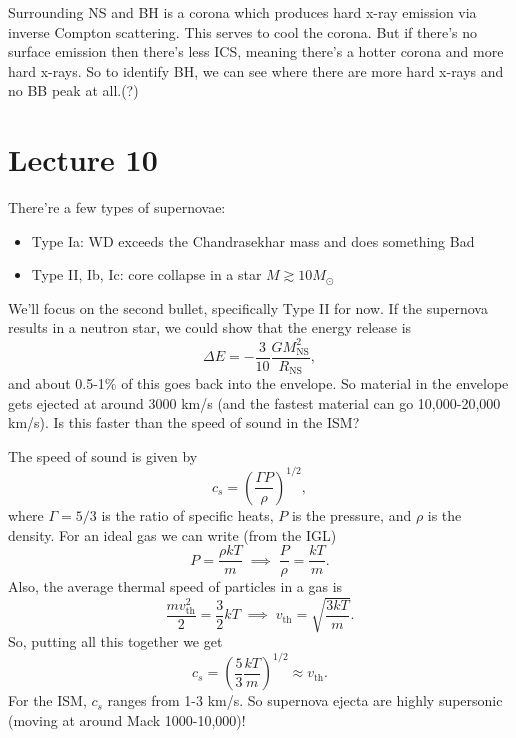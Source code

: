 \documentclass[../a122main.tex]{subfiles}
\begin{document}
Surrounding NS and BH is a corona which produces hard x-ray emission via inverse Compton scattering.
This serves to cool the corona.
But if there's no surface emission then there's less ICS, meaning there's a hotter corona and more hard x-rays.
So to identify BH, we can see where there are more hard x-rays and no BB peak at all.(?)

\section{Lecture 10}
There're a few types of supernovae:
\begin{itemize}[topsep=0pt]
    \item Type Ia: WD exceeds the Chandrasekhar mass and does something Bad
    \item Type II, Ib, Ic: core collapse in a star $M \gtrsim 10 M_\odot$
\end{itemize}
We'll focus on the second bullet, specifically Type II for now.
If the supernova results in a neutron star, we could show that the energy release is
\[ \Delta E = -\frac{3}{10} \frac{GM_\textrm{NS}^2}{R_\text{NS}}, \]
and about 0.5-1\% of this goes back into the envelope.
So material in the envelope gets ejected at around 3000 km/s (and the fastest material can go 10,000-20,000 km/s).
Is this faster than the speed of sound in the ISM?

The speed of sound is given by
\[ c_s = \left( \frac{\Gamma P}{\rho} \right)^{1 / 2}, \]
where $\Gamma = 5 / 3$ is the ratio of specific heats, $P$ is the pressure, and $\rho$ is the density.
For an ideal gas we can write (from the IGL)
\[ P = \frac{\rho kT}{m} \;\implies\; \frac{P}{\rho} = \frac{kT}{m}. \]
Also, the average thermal speed of particles in a gas is
\[ \frac{mv_\textrm{th}^2}{2} = \frac{3}{2} kT \;\implies\; v_\textrm{th} = \sqrt{\frac{3kT}{m}}. \]
So, putting all this together we get
\[ c_s = \left( \frac{5}{3} \frac{kT}{m} \right)^{1 / 2} \approx v_\textrm{th}. \]
For the ISM, $c_s$ ranges from 1-3 km/s.
So supernova ejecta are highly supersonic (moving at around Mack 1000-10,000)!
\end{document}
